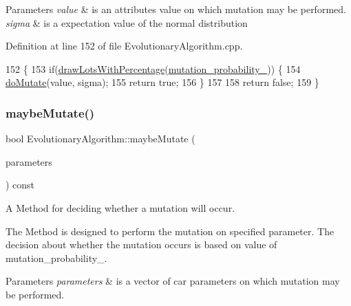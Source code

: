\begin{DoxyParams}{Parameters}
{\em value} & is an attribute\textquotesingle{}s value on which mutation may be performed. \\
\hline
{\em sigma} & is a expectation value of the normal distribution \\
\hline
\end{DoxyParams}


Definition at line 152 of file Evolutionary\+Algorithm.\+cpp.


\begin{DoxyCode}
152                                                                           \{
153     \textcolor{keywordflow}{if}(\hyperlink{classEvolutionaryAlgorithm_a20aec1049a8837cddef2305259450fe3}{drawLotsWithPercentage}(\hyperlink{classEvolutionaryAlgorithm_ab847e49664c7b97e1e55963e6f33b332}{mutation\_probability\_})) \{
154         \hyperlink{classEvolutionaryAlgorithm_a02a05f75707440141d9ec3129cadc681}{doMutate}(value, sigma);
155         \textcolor{keywordflow}{return} \textcolor{keyword}{true};
156     \}
157 
158     \textcolor{keywordflow}{return} \textcolor{keyword}{false};
159 \}
\end{DoxyCode}
\mbox{\label{classEvolutionaryAlgorithm_ac144c241688bbe9a50c7ce98f6895ba2}} 
\subsubsection{\texorpdfstring{maybe\+Mutate()}{maybeMutate()}\hspace{0.1cm}{\footnotesize\ttfamily [2/2]}}
{\footnotesize\ttfamily bool Evolutionary\+Algorithm\+::maybe\+Mutate (\begin{DoxyParamCaption}\item[{\hyperlink{classCarParameters}{Car\+Parameters} \&}]{parameters }\end{DoxyParamCaption}) const}



A Method for deciding whether a mutation will occur. 

The Method is designed to perform the mutation on specified parameter. The decision about whether the mutation occurs is based on value of mutation\+\_\+probability\+\_\+. 
\begin{DoxyParams}{Parameters}
{\em parameters} & is a vector of car parameters on which mutation may be performed. \\
\hline
\end{DoxyParams}


